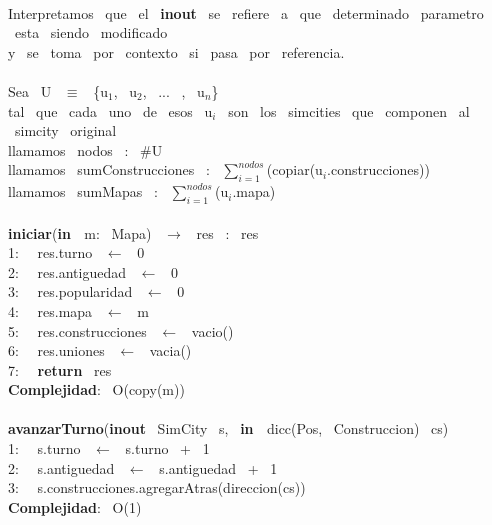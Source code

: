 \begin{Algoritmos} \\
    \noindent Interpretamos \ que \ el \ \textbf{inout} \ se \ refiere \ a \ que \ determinado \ parametro \ esta \ siendo \ modificado\\
    y \ se \ toma \ por \ contexto \ si \ pasa \ por \ referencia.\\
    \\
    Sea \ U \ $\equiv$ \ \{u$_1$, \ u$_2$, \ ... \ , \ u$_n$\}\\
    tal \ que \ cada \ uno \ de \ esos \ u$_i$ \ son \ los \ simcities \ que \ componen \ al \ simcity \ original\\
    llamamos \ nodos \ : \ $ \# $U\\
    llamamos \ sumConstrucciones \ : \ $\sum_{i=1}^{nodos}$(copiar(u$_i$.construcciones))\\
    llamamos \ sumMapas \ : \ $\sum_{i=1}^{nodos}$(u$_i$.mapa)\\
    \\
    \makebox[\linewidth]{\rule{\textwidth}{0.4pt}}
    \textbf{iniciar}(\textbf{in \ }m: \ Mapa) \ $\longrightarrow$ \ res \ : \ res\\
    1: \  \ res.turno \ $\leftarrow$ \ 0\\
    2: \  \ res.antiguedad \ $\leftarrow$ \ 0\\
    3: \  \ res.popularidad \ $\leftarrow$ \ 0\\
    4: \  \ res.mapa \ $\leftarrow$ \ m\\
    5: \  \ res.construcciones \ $\leftarrow$ \ vacio()\\
    6: \  \ res.uniones \ $\leftarrow$ \ vacia()\\
    7: \  \ \textbf{return} \ res\\
    \textbf{Complejidad}: \ O(copy(m))\\
    \makebox[\linewidth]{\rule{\textwidth}{0.4pt}}
    \\
    \makebox[\linewidth]{\rule{\textwidth}{0.4pt}}
    \textbf{avanzarTurno}(\textbf{inout} \ SimCity \ s, \ \textbf{in \ }dicc(Pos, \ Construccion) \ cs)\\
    1: \  \ s.turno \ $\leftarrow$ \ s.turno \ + \ 1 \ \\
    2: \  \ s.antiguedad \ $\leftarrow$ \ s.antiguedad \ + \ 1 \ \\
    3: \  \ s.construcciones.agregarAtras(direccion(cs))\\
    \textbf{Complejidad}: \ O(1)\\
    \makebox[\linewidth]{\rule{\textwidth}{0.4pt}}

\end{Algoritmos}
